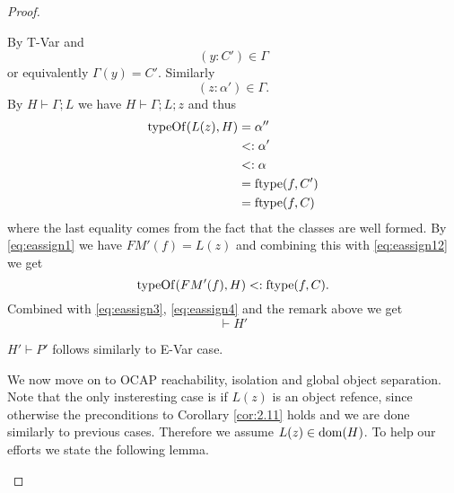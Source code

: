 \begin{proof}
\begin{description}
\begin{description}
\begin{description}
              By {\sc T-Var} and 
              \begin{equation}\label{eq:eassign10}
                (y: C') \in \Gamma 
              \end{equation}
              or equivalently $\Gamma(y) = C'$.
              Similarly
              \begin{equation} \label{eq:eassign11}
                (z: \alpha') \in \Gamma.
              \end{equation}
              By $H \vdash \Gamma; L$ we have $H \vdash \Gamma; L; z$ and thus
              \begin{equation} \label{eq:eassign12}
                \begin{aligned}
                  \mbox{$\mathrm{typeOf}$}(L(z), H) &= \alpha'' \\ 
                                   &<: \alpha' \\ 
                                   &<: \alpha \\ 
                                   &= \mbox{$\mathrm{ftype}$}(f, C') \\ 
                                   &= \mbox{$\mathrm{ftype}$}(f, C)
                \end{aligned}
              \end{equation}
              where the last equality comes from the fact that the classes are
              well formed. By \eqref{eq:eassign1} we have $FM'(f) = L(z)$ and
              combining this with \eqref{eq:eassign12} we get
              \begin{equation} \label{eq:eassign13}
                \mbox{$\mathrm{typeOf}$}(FM'(f), H) <: \mbox{$\mathrm{ftype}$}(f, C).
              \end{equation}
              Combined with \eqref{eq:eassign3}, \eqref{eq:eassign4} and the
              remark above we get
              \begin{equation*} 
                \vdash H'
              \end{equation*}

              $H' \vdash P'$ follows similarly to {\sc E-Var} case.

              We now move on to OCAP reachability, isolation and global object
              separation.  Note that the only insteresting case is if $L(z)$ is
              an object refence, since otherwise the preconditions to Corollary
              \ref{cor:2.11} holds and we are done similarly to previous cases.
              Therefore we assume $L(z) \in \mbox{$\mathrm{dom}$}(H)$.  To help our efforts we
              state the following lemma.


\end{description}
\end{description}
\end{description}
\end{proof}
